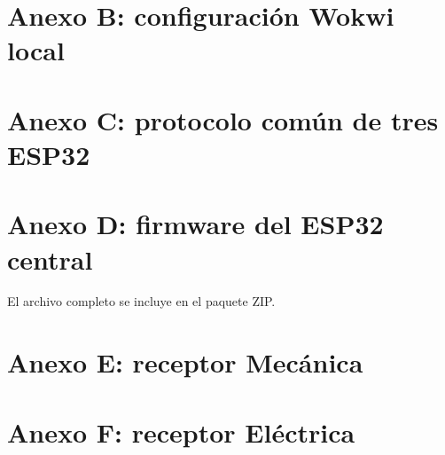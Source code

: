 \documentclass[11pt,a4paper]{article}
\begin{document}
\section{Anexo B: configuración Wokwi local}


\section{Anexo C: protocolo común de tres ESP32}


\section{Anexo D: firmware del ESP32 central}
\par\smallskip El archivo completo se incluye en el paquete ZIP.

\section{Anexo E: receptor Mecánica}


\section{Anexo F: receptor Eléctrica}

\end{document}
